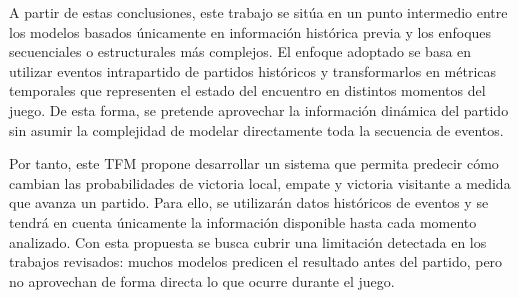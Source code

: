 A partir de estas conclusiones, este trabajo se sitúa en un punto intermedio entre los modelos basados únicamente en información histórica previa y los enfoques secuenciales o estructurales más complejos. El enfoque adoptado se basa en utilizar eventos intrapartido de partidos históricos y transformarlos en métricas temporales que representen el estado del encuentro en distintos momentos del juego. De esta forma, se pretende aprovechar la información dinámica del partido sin asumir la complejidad de modelar directamente toda la secuencia de eventos.

Por tanto, este TFM propone desarrollar un sistema que permita predecir cómo cambian las probabilidades de victoria local, empate y victoria visitante a medida que avanza un partido. Para ello, se utilizarán datos históricos de eventos y se tendrá en cuenta únicamente la información disponible hasta cada momento analizado. Con esta propuesta se busca cubrir una limitación detectada en los trabajos revisados: muchos modelos predicen el resultado antes del partido, pero no aprovechan de forma directa lo que ocurre durante el juego.